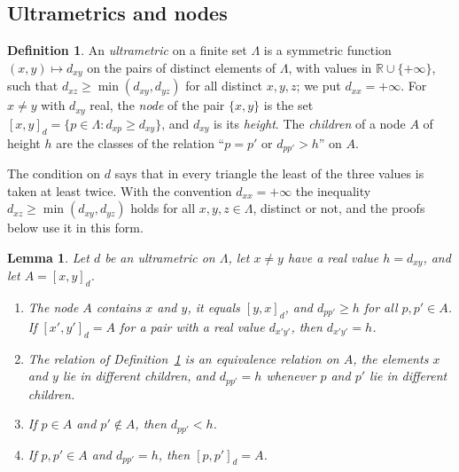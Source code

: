 \documentclass[11pt]{amsart}
\newtheorem{lemma}[theorem]{Lemma}
\theoremstyle{definition}
\newtheorem{definition}[theorem]{Definition}
\theoremstyle{remark}
\numberwithin{equation}{section}
\newcommand{\RR}{\mathbb{R}}
\newcommand{\nd}[2]{[#1]_{#2}}
\begin{document}
\subsection{Ultrametrics and nodes}

\begin{definition}\label{def:ultra}
An \emph{ultrametric} on a finite set $\Lambda$ is a symmetric function
$(x, y) \mapsto d_{xy}$ on the pairs of distinct elements of $\Lambda$, with values in
$\RR \cup \{+\infty\}$, such that $d_{xz} \ge \min(d_{xy}, d_{yz})$ for all distinct $x, y, z$; we put
$d_{xx} = +\infty$. For $x \ne y$ with $d_{xy}$ real, the \emph{node} of the pair $\{x, y\}$ is the set
$\nd{x, y}{d} = \{ p \in \Lambda : d_{xp} \ge d_{xy} \}$, and $d_{xy}$ is its \emph{height}. The
\emph{children} of a node $A$ of height $h$ are the classes of the relation ``$p = p'$ or $d_{pp'} > h$''
on $A$.
\end{definition}

The condition on $d$ says that in every triangle the least of the three values is taken at least twice.
With the convention $d_{xx} = +\infty$ the inequality $d_{xz} \ge \min(d_{xy}, d_{yz})$ holds for all
$x, y, z \in \Lambda$, distinct or not, and the proofs below use it in this form.

\begin{lemma}\label{lem:tree}
Let $d$ be an ultrametric on $\Lambda$, let $x \ne y$ have a real value $h = d_{xy}$, and let
$A = \nd{x, y}{d}$.
\begin{enumerate}
\item[(a)] The node $A$ contains $x$ and $y$, it equals $\nd{y, x}{d}$, and $d_{pp'} \ge h$ for all
$p, p' \in A$. If $\nd{x', y'}{d} = A$ for a pair with a real value $d_{x'y'}$, then $d_{x'y'} = h$.
\item[(b)] The relation of Definition~\ref{def:ultra} is an equivalence relation on $A$, the elements $x$
and $y$ lie in different children, and $d_{pp'} = h$ whenever $p$ and $p'$ lie in different children.
\item[(c)] If $p \in A$ and $p' \notin A$, then $d_{pp'} < h$.
\item[(d)] If $p, p' \in A$ and $d_{pp'} = h$, then $\nd{p, p'}{d} = A$.
\end{enumerate}
\end{lemma}
\end{document}
